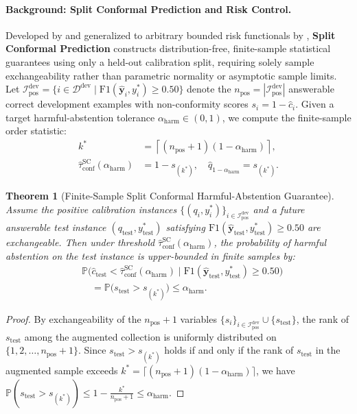 \documentclass[11pt]{article}
\newtheorem{theorem}{Theorem}
\begin{document}
\paragraph{Background: Split Conformal Prediction and Risk Control.}
Developed by \citet{vovk2005algorithmic} and generalized to arbitrary bounded risk functionals by \citet{angelopoulos2024conformal}, \textbf{Split Conformal Prediction} constructs distribution-free, finite-sample statistical guarantees using only a held-out calibration split, requiring solely sample exchangeability rather than parametric normality or asymptotic sample limits. Let $\mathcal{I}_{\text{pos}}^{\text{dev}} = \{i \in \mathcal{D}^{\text{dev}} \mid \text{F1}(\hat{\mathbf{y}}_i, y_i^*) \ge 0.50\}$ denote the $n_{\text{pos}} = |\mathcal{I}_{\text{pos}}^{\text{dev}}|$ answerable correct development examples with non-conformity scores $s_i = 1 - \hat{c}_i$. Given a target harmful-abstention tolerance $\alpha_{\text{harm}} \in (0, 1)$, we compute the finite-sample order statistic:
\begin{align}
k^* &= \left\lceil (n_{\text{pos}} + 1)(1 - \alpha_{\text{harm}}) \right\rceil, \label{eq:m3_conformal} \\
\hat{\tau}_{\text{conf}}^{\text{SC}}(\alpha_{\text{harm}}) &= 1 - s_{(k^*)}, \quad \hat{q}_{1-\alpha_{\text{harm}}} = s_{(k^*)}. \label{eq:m3_tau_sc}
\end{align}

\begin{theorem}[Finite-Sample Split Conformal Harmful-Abstention Guarantee]
\label{thm:split_conformal}
Assume the positive calibration instances $\{(q_i, y_i^*)\}_{i \in \mathcal{I}_{\text{pos}}^{\text{dev}}}$ and a future answerable test instance $(q_{\text{test}}, y_{\text{test}}^*)$ satisfying $\text{F1}(\hat{\mathbf{y}}_{\text{test}}, y_{\text{test}}^*) \ge 0.50$ are exchangeable. Then under threshold $\hat{\tau}_{\text{conf}}^{\text{SC}}(\alpha_{\text{harm}})$, the probability of harmful abstention on the test instance is upper-bounded in finite samples by:
\begin{align}
&\mathbb{P}\bigl( \hat{c}_{\text{test}} < \hat{\tau}_{\text{conf}}^{\text{SC}}(\alpha_{\text{harm}}) \;\big|\; \text{F1}(\hat{\mathbf{y}}_{\text{test}}, y_{\text{test}}^*) \ge 0.50 \bigr) \nonumber \\
&\quad = \mathbb{P}\bigl( s_{\text{test}} > s_{(k^*)} \bigr) \le \alpha_{\text{harm}}.
\label{eq:thm_conformal}
\end{align}
\end{theorem}
\begin{proof}
By exchangeability of the $n_{\text{pos}} + 1$ variables $\{s_i\}_{i \in \mathcal{I}_{\text{pos}}^{\text{dev}}} \cup \{s_{\text{test}}\}$, the rank of $s_{\text{test}}$ among the augmented collection is uniformly distributed on $\{1, 2, \dots, n_{\text{pos}} + 1\}$. Since $s_{\text{test}} > s_{(k^*)}$ holds if and only if the rank of $s_{\text{test}}$ in the augmented sample exceeds $k^* = \lceil (n_{\text{pos}} + 1)(1 - \alpha_{\text{harm}}) \rceil$, we have $\mathbb{P}(s_{\text{test}} > s_{(k^*)}) \le 1 - \frac{k^*}{n_{\text{pos}} + 1} \le \alpha_{\text{harm}}$.
\end{proof}
\end{document}
